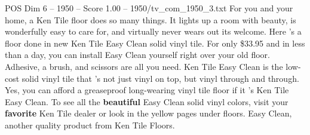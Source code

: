 \begin{textsample}{POS Dim 6 – 1950 – Score 1.00 – 1950/tv\_com\_1950\_3.txt}  \label{ex:f6_pos_016}
For you and your home, a Ken Tile floor does so many things.
It lights up a room with beauty, is wonderfully easy to care for, and virtually never wears out its welcome.
Here 's a floor done in new Ken Tile Easy Clean solid vinyl tile.
For only \$33.95 and in less than a day, you can install Easy Clean yourself right over your old floor.
Adhesive, a brush, and scissors are all you need.
Ken Tile Easy Clean is the low-cost solid vinyl tile that 's not just vinyl on top, but vinyl through and through.
Yes, you can afford a greaseproof long-wearing vinyl tile floor if it 's Ken Tile Easy Clean.
To see all the \textbf{beautiful} Easy Clean solid vinyl colors, visit your \textbf{favorite} Ken Tile dealer or look in the yellow pages under floors.
Easy Clean, another quality product from Ken Tile Floors.

\end{textsample}
